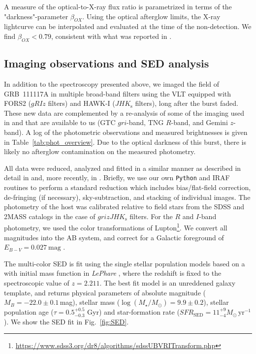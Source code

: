 \documentclass{aa}    %
\begin{document}
A measure of the optical-to-X-ray flux ratio is parametrized in terms of the
"darkness"-parameter $\beta_{OX} $\citep{Jakobsson2004}. Using the optical
afterglow limits\citep{Cucchiara2011, Cenko2011}, the X-ray lightcurve can be
interpolated and evaluated at the time of the non-detection. We find $\beta_{OX}
< 0.79$, consistent with what was reported in \citet{Sakamoto2013}.

\subsection{Imaging observations and SED analysis} \label{SED}

In addition to the spectroscopy presented above, we imaged the field of
GRB~111117A in multiple broad-band filters using the VLT equipped with FORS2
($gRIz$ filters) and HAWK-I ($JHK_{\mathrm{s}}$ filters), long after the burst
faded. These new data are complemented by a re-analysis of some of the imaging
used in \citet{Margutti2012} and \citet{Sakamoto2013} that are available to us
(GTC $gri$-band, TNG $R$-band, and Gemini $z$-band). A log of the photometric
observations and measured brightnesses is given in
Table~\ref{tab:phot_overview}. Due to the optical darkness of this burst, there
is likely no afterglow contamination on the measured photometry.

All data were reduced, analyzed and fitted in a similar manner as described in
detail in \citet{Kruhler2011a} and, more recently, in \citet{Schulze2016}.
Briefly, we use our own \texttt{Python} and IRAF routines to perform a standard
reduction which includes bias/flat-field correction, de-fringing (if necessary),
sky-subtraction, and stacking of individual images. The photometry of the host
was calibrated relative to field stars from the SDSS and 2MASS catalogs in the
case of $grizJHK_{\mathrm{s}}$ filters.
For the $R$ and $I$-band photometry, we used the color transformations of
Lupton\footnote{\url{https://www.sdss3.org/dr8/algorithms/sdssUBVRITransform.php}}. 
We convert all magnitudes into the AB system, and correct for a Galactic 
foreground of $E_{B-V}=0.027~\mathrm{mag}$ \citep{Schlegel1998, Schlafly2011}.



The multi-color SED is fit using the \citet{Bruzual2003} single stellar population
models based on a \citet{Chabrier2003} with initial mass function in
\emph{LePhare} \citep{Ilbert2006}, where the redshift is fixed to the
spectroscopic value of $z=2.211$. The best fit model is an unreddened galaxy
template, and returns physical parameters of absolute magnitude
($M_B=-22.0\pm0.1$\,mag), stellar mass ($\log(M_{\star}/M_\odot) = 9.9\pm0.2$),
stellar population age ($\tau = 0.5_{-0.3}^{+0.5}$ Gyr) and star-formation rate
($SFR_{\mathrm{SED}}=11_{-4}^{+9} M_\odot\,\mathrm{yr}^{-1}$). We show the SED
fit in Fig.~\ref{fig:SED}.
\end{document}
